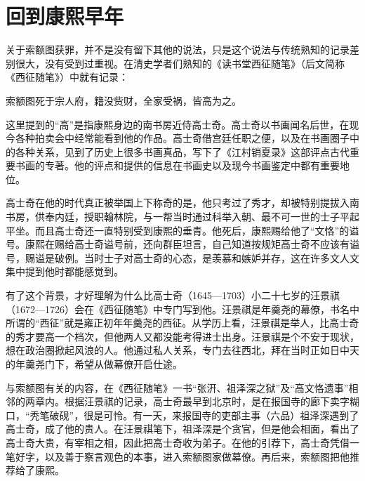 \chapter{回到康熙早年}

关于索额图获罪，并不是没有留下其他的说法，只是这个说法与传统熟知的记录差别很大，没有受到过重视。在清史学者们熟知的《读书堂西征随笔》（后文简称《西征随笔》）中就有记录：



\begin{bookquote}索额图死于宗人府，籍没赀财，全家受祸，皆高为之。\end{bookquote}


这里提到的“高”是指康熙身边的南书房近侍高士奇。高士奇以书画闻名后世，在现今各种拍卖会中经常能看到他的作品。高士奇借宫廷任职之便，以及在书画圈子中的各种关系，见到了历史上很多书画真品，写下了《江村销夏录》这部评点古代重要书画的专著。他的评点和提供的信息在书画史以及现今书画鉴定中都有重要地位。



高士奇在他的时代真正被举国上下称奇的是，他只考过了秀才，却被特别提拔入南书房，供奉内廷，授职翰林院，与一帮当时通过科举入朝、最不可一世的士子平起平坐。而且高士奇还一直特别受到康熙的垂青。他死后，康熙赐给他了“文恪”的谥号。康熙在赐给高士奇谥号前，还向群臣坦言，自己知道按规矩高士奇不应该有谥号，赐谥是破例。当时士子对高士奇的心态，是羡慕和嫉妒并存，这在许多文人文集中提到他时都能感觉到。



有了这个背景，才好理解为什么比高士奇（1645—1703）小二十七岁的汪景祺（1672—1726）会在《西征随笔》中专门写到他。汪景祺是年羹尧的幕僚，书名中所谓的“西征”就是雍正初年年羹尧的西征。从学历上看，汪景祺是举人，比高士奇的秀才要高一个档次，但他两人又都没能考得进士出身。汪景祺是个不安于现状，想在政治圈掀起风浪的人。他通过私人关系，专门去往西北，拜在当时正如日中天的年羹尧门下，希望从做幕僚开启仕途。



与索额图有关的内容，在《西征随笔》一书“张汧、祖泽深之狱”及“高文恪遗事”相邻的两章内。根据汪景祺的记录，高士奇最早到北京时，是在报国寺的廊下卖字糊口，“秃笔破砚”，很是可怜。有一天，来报国寺的吏部主事（六品）祖泽深遇到了高士奇，成了他的贵人。在汪景祺笔下，祖泽深是个贪官，但是他会相面，看出了高士奇大贵，有宰相之相，因此把高士奇收为弟子。在他的引荐下，高士奇凭借一笔好字，以及善于察言观色的本事，进入索额图家做幕僚。再后来，索额图把他推荐给了康熙。



